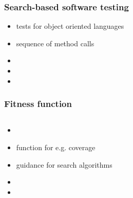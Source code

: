 \begin{frame}
	\frametitle{Search-based software testing}
	
	\begin{itemize}
		\item tests for object oriented languages
		\item sequence of method calls
		\item
		\item
		\item
	\end{itemize}
			
	
\end{frame}

\begin{frame}
	\frametitle{Fitness function}
	
	\begin{columns}[c]
		

		\begin{itemize}
			\item 
			\item function for e.g. coverage
			\item guidance for search algorithms
			\item
			\item
		\end{itemize}
		
		

	\end{columns}
	
\end{frame}

